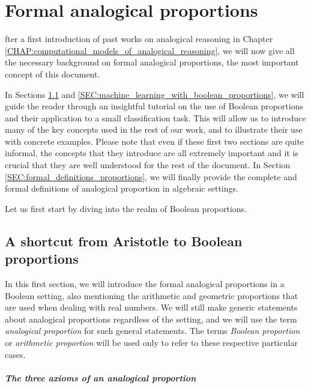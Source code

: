\chapter{Formal analogical proportions}
\label{CHAP:formal_analogical_proportions}

fter a first introduction of past works on analogical reasoning in
Chapter \ref{CHAP:computational_models_of_analogical_reasoning}, we will now
give all the necessary background on formal analogical proportions, the most
important concept of this document.

In Sections \ref{SEC:shortcut_from_aristotle_to_boolean_proportions} and
\ref{SEC:machine_learning_with_boolean_proportions}, we will guide the reader
through an insightful tutorial on the use of Boolean proportions and their
application to a small classification task. This will allow us to
introduce many of the key concepts used in the rest of our work, and to
illustrate their use with concrete examples. Please note that even if
these first two sections are quite informal, the concepts that they introduce
are all extremely important and it is crucial that they are well understood for
the rest of the document.  In Section \ref{SEC:formal_definitions_proportions},
we will finally provide the complete and formal definitions of analogical
proportion in algebraic settings.

Let us first start by diving into the realm of Boolean proportions.

\section{A shortcut from Aristotle to Boolean proportions}
\label{SEC:shortcut_from_aristotle_to_boolean_proportions}

In this first section, we will introduce the formal analogical proportions in a
Boolean setting, also mentioning the arithmetic and geometric proportions that
are used when dealing with real numbers. We will still make generic statements
about analogical proportions regardless of the setting, and we will
use the term \textit{analogical proportion} for such general statements. The
terms \textit{Boolean proportion } or \textit{arithmetic proportion} will be
used only to refer to these respective particular cases.

\paragraph{The three axioms of an analogical proportion\\}

